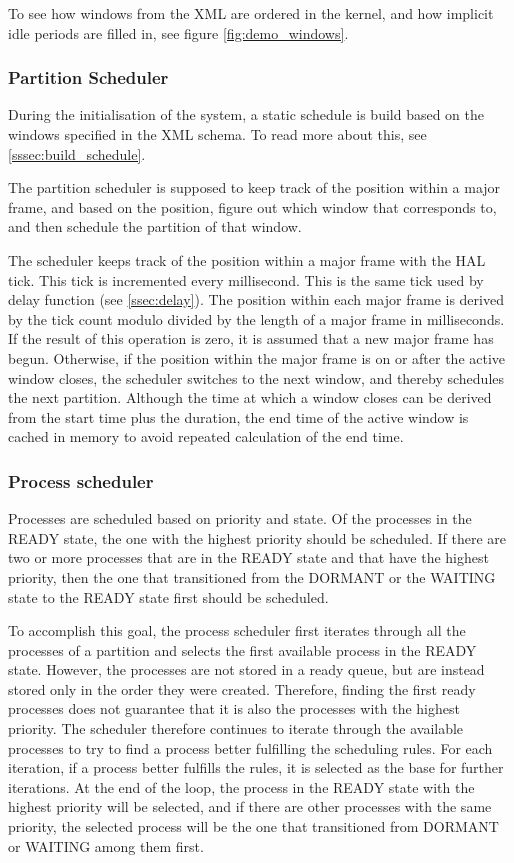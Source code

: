 To see how windows from the XML are ordered in the kernel, and how implicit
idle periods are filled in, see figure \ref{fig:demo_windows}.
\subsubsection{Partition Scheduler}
During the initialisation of the system, a static schedule is build based on the
windows specified in the XML schema. To read more about this, see \ref{sssec:build_schedule}.

The partition scheduler is supposed to keep track of the position within a major
frame, and based on the position, figure out which window that corresponds to,
and then schedule the partition of that window.

The scheduler keeps track of the position within a major frame with the HAL
tick. This tick is incremented every millisecond. This is the same tick used by
delay function (see \ref{ssec:delay}). The position within each major frame is
derived by the tick count modulo divided by the length of a major frame in
milliseconds. If the result of this operation is zero, it is assumed that a new
major frame has begun. Otherwise, if the position within the major frame is on
or after the active window closes, the scheduler switches to the next window,
and thereby schedules the next partition. Although the time at which a window closes
can be derived from the start time plus the duration, the end time of the
active window is cached in memory to avoid repeated calculation of the end time.

\subsubsection{Process scheduler}
Processes are scheduled based on priority and state. Of the processes in the
READY state, the one with the highest priority should be scheduled. If there are
two or more processes that are in the READY state and that have the highest
priority, then the one that transitioned from the DORMANT or the WAITING state
to the READY state first should be scheduled.

To accomplish this goal, the process scheduler first iterates through all the
processes of a partition and selects the first available process in the READY
state. However, the processes are not stored in a ready queue, but are instead
stored only in the order they were created. Therefore, finding the first ready
processes does not guarantee that it is also the processes with the highest
priority. The scheduler therefore continues to iterate through the available
processes to try to find a process better fulfilling the scheduling rules. For
each iteration, if a process better fulfills the rules, it is selected as the
base for further iterations. At the end of the loop, the process in the READY
state with the highest priority will be selected, and if there are other
processes with the same priority, the selected process will be the one that
transitioned from DORMANT or WAITING among them first.

